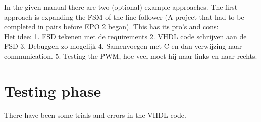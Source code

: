 In the given manual \cite{EPO2_manual} there are two (optional) example approaches. The first approach is expanding the FSM of the line follower (A project that had to be completed in pairs before EPO 2 began). This has its pro's and cons: 
\\


Het idee:
1. FSD tekenen met de requirements
2. VHDL code schrijven aan de FSD
3. Debuggen zo mogelijk
4. Samenvoegen met C en dan verwijzing naar communication.
5. Testing the PWM, hoe veel moet hij naar links en naar rechts.

\section{Testing phase}

There have been some trials and errors in the VHDL code. %